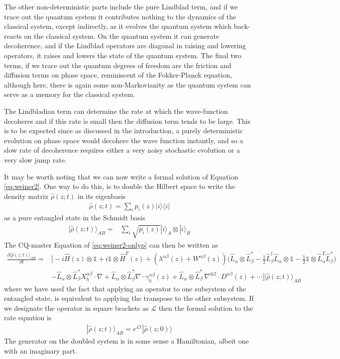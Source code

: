\documentclass[aps,pra,showpacs,citeautoscript,amsmath,amssymb,floatfix,superscriptaddress,bbm, verbatim,amsfonts,changes,12pt,nofootinbib,longbibliography]{revtex4-2}
\newcommand{\id}{\mathbb{1}}
\newcommand{\ket}[1]{|#1\rangle}
\newcommand{\proj}[1]{|#1\rangle\!\langle#1|}
\newcommand{\foothide}[1]{\ignorespaces} %
\def\z{{z}}
\def\L{{\hat{L}}}
\def\Hq{\hat{H}}
\def\rate{{W}}
\def\linrate{{\lambda}}
\def\ab{^{\alpha\beta}}
\renewcommand{\varrho}{\hat{\rho}}
\def\cqstate{\varrho}
\def\psiz{{\varrho(\z;t)}}
\def\psizt{{\varrho(\z;t)}}
\def\friction{\gamma}
\begin{document}
The other non-deterministic parts include the pure Lindblad term, and if we trace out the quantum system it contributes nothing to the dynamics of the classical system, except indirectly, as it evolves the quantum system which back-reacts on the classical system.  On the quantum system it can generate decoherence, and if the Lindblad operators are diagonal in raising and lowering operators, it raises and lowers the state of the quantum system. The final two terms, if we trace out the quantum degrees of freedom are the friction and diffusion terms on phase space, reminiscent of the Fokker-Planck equation, although here, there is again some non-Markovianity as the quantum system can serve as a memory for the classical system.

The Lindbladian term can determine the rate at which the wave-function decoheres and if this rate is small then the diffusion term tends to be large. This is to be expected since as discussed in the introduction, a purely deterministic evolution on phase space would decohere the wave function instantly, and so a slow rate of decoherence requires either a very noisy stochastic evolution or a very slow jump rate.



It may be worth noting that we can now write a formal solution of Equation \eqref{eq:weiner2}. One way to do this, is to  double the Hilbert space\cite{FeynmanVernon1963,jamiolkowski1972linear,choi1975completely}\foothide{For the moment we take the quantum system to be finite dimensional, since extension to the continuous case is straightforward} to write the density matrix $\psiz$ in its eigenbasis
\begin{align}
\psiz=\sum_i p_i(\z)\proj{i}
\end{align}
as a pure entangled state in the Schmidt basis
\begin{align}
\ket{\psiz}_{AB}=&\sum_i \sqrt{p_i(\z)}\ket{i}_A\otimes\ket{i}_B
\end{align}
The CQ-master Equation of \eqref{eq:weiner2-onlyp} can then be written as
\begin{align}
\frac{\partial\ket{\psiz}_{AB}}{\partial t}
=&\Big[-i\Hq(\z)\otimes\id+i\id\otimes\Hq^T(\z)
+(\linrate\ab(\z)+\rate\ab(\z)) \big(\L_{\alpha}\otimes\L^*_{\beta}
-\frac{1}{2}\L^\dagger_\beta\L_\alpha\otimes\id
-\frac{1}{2}\id\otimes\L^T_\alpha\L^*_\beta\big)
\nonumber\\
&-
\L_{\alpha}\otimes\L^*_{\beta}X_h\ab\cdot\nabla
+
\L_{\alpha}\otimes\L^*_{\beta}\nabla \cdot\friction\ab_h(\z)
+
\L_{\alpha}\otimes\L^*_{\beta}\,\nabla^{\otimes 2}\cdot D^{\alpha\beta}(\z)
+\cdots
\Big]\ket{\psiz}_{AB}
\label{eq:doubled}
\end{align}
where we have used the fact that applying an operator to one subsystem of the entangled state, is equivalent to applying the transpose to the other subsystem\cite{jozsa1994fidelity}.
If we designate the operator in square brackets as $\bm{\mathcal{L}}$ then the formal solution to the rate equation is
\begin{align}
\ket{\psizt}_{AB}=e^{\bm{\mathcal{L}}t}\ket{\cqstate(\z;0)}
\label{eq:prop}
\end{align}
The generator on the doubled system is in some sense a Hamiltonian, albeit one with an imaginary part.
\end{document}
